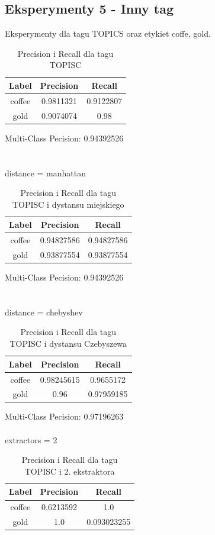 \documentclass{classrep}
\begin{document}
\subsection{Eksperymenty 5 - Inny tag}
Eksperymenty dla tagu TOPICS oraz etykiet coffe, gold.
\begin{table}[H]
\begin{tabular}{|c|c|c|}
\hline
Label  & Precision & Recall    \\ \hline
coffee & 0.9811321 & 0.9122807 \\ \hline
gold   & 0.9074074 & 0.98      \\ \hline
\end{tabular}
\caption{Precision i Recall dla tagu TOPISC}
\end{table}
Multi-Class Pecision: 0.94392526\\
\\
\\
distance = manhattan
\begin{table}[H]
\begin{tabular}{|c|c|c|}
\hline
Label  & Precision  & Recall     \\ \hline
coffee & 0.94827586 & 0.94827586 \\ \hline
gold   & 0.93877554 & 0.93877554 \\ \hline
\end{tabular}
\caption{Precision i Recall dla tagu TOPISC i dystansu miejskiego}
\end{table}
Multi-Class Pecision: 0.94392526\\
\\
\\
distance = chebyshev
\begin{table}[H]
\begin{tabular}{|c|c|c|}
\hline
Label  & Precision  & Recall     \\ \hline
coffee & 0.98245615 & 0.9655172  \\ \hline
gold   & 0.96       & 0.97959185 \\ \hline
\end{tabular}
\caption{Precision i Recall dla tagu TOPISC i dystansu Czebyszewa}
\end{table}
Multi-Class Pecision: 0.97196263\\
\\
extractors = 2
\begin{table}[H]
\begin{tabular}{|c|c|c|}
\hline
Label  & Precision & Recall      \\ \hline
coffee & 0.6213592 & 1.0         \\ \hline
gold   & 1.0       & 0.093023255 \\ \hline
\end{tabular}
\caption{Precision i Recall dla tagu TOPISC i 2. ekstraktora}
\end{table}
\end{document}
